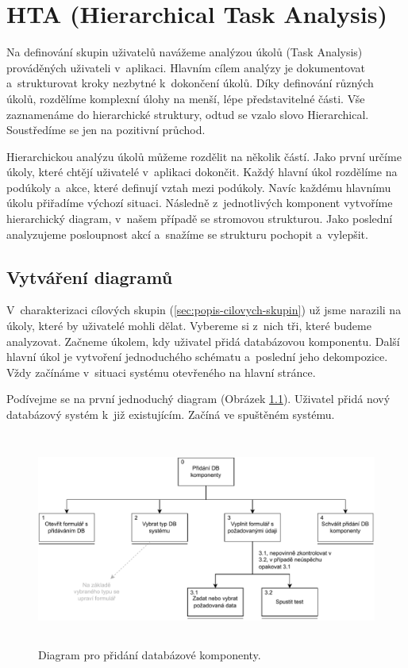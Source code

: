 \chapter{HTA (Hierarchical Task Analysis)}

Na definování skupin uživatelů navážeme analýzou úkolů (Task Analysis) prováděných uživateli v~aplikaci. Hlavním cílem analýzy je dokumentovat a~strukturovat kroky nezbytné k~dokončení úkolů. Díky definování různých úkolů, rozdělíme komplexní úlohy na menší, lépe představitelné části. Vše zaznamenáme do hierarchické struktury, odtud se vzalo slovo Hierarchical. Soustředíme se jen na pozitivní průchod.

Hierarchickou analýzu úkolů můžeme rozdělit na několik částí. Jako první určíme úkoly, které chtějí uživatelé v~aplikaci dokončit. Každý hlavní úkol rozdělíme na podúkoly a~akce, které definují vztah mezi podúkoly. Navíc každému hlavnímu úkolu přiřadíme výchozí situaci. Následně z~jednotlivých komponent vytvoříme hierarchický diagram, v~našem případě se stromovou strukturou. Jako poslední analyzujeme posloupnost akcí a~snažíme se strukturu pochopit a~vylepšit.

\section{Vytváření diagramů}

V~charakterizaci cílových skupin (\ref{sec:popis-cilovych-skupin}) už jsme narazili na úkoly, které by uživatelé mohli dělat. Vybereme si z~nich tři, které budeme analyzovat. Začneme úkolem, kdy uživatel přidá databázovou komponentu. Další hlavní úkol je vytvoření jednoduchého schématu a~poslední jeho dekompozice. Vždy začínáme v~situaci systému otevřeného na hlavní stránce.

Podívejme se na první jednoduchý diagram (Obrázek \ref{obr03:hta1}). Uživatel přidá nový databázový systém k~již existujícím. Začíná ve spuštěném systému.

\begin{figure}[htb]
  \centering
  \includegraphics[height=70mm]{../img/HTA-1}
  \caption{Diagram pro přidání databázové komponenty.}
  \label{obr03:hta1}
\end{figure}

